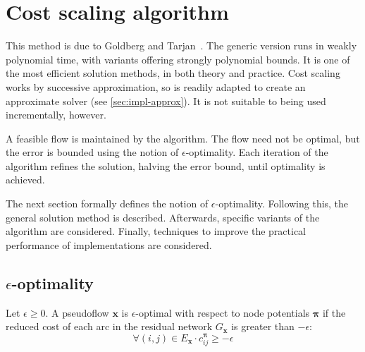 \section{Cost scaling algorithm} \label{sec:impl-cost-scaling}


This method is due to Goldberg and Tarjan~\cite{Goldberg:1987}. The generic version runs in weakly polynomial time, with variants offering strongly polynomial bounds. It is one of the most efficient solution methods, in both theory and practice\footnotemark. Cost scaling works by successive approximation, so is readily adapted to create an approximate solver (see \cref{sec:impl-approx}). It is not suitable to being used incrementally, however.

A feasible flow is maintained by the algorithm. The flow need not be optimal, but the error is bounded using the notion of $\epsilon$-optimality. Each iteration of the algorithm refines the solution, halving the error bound, until optimality is achieved. 

The next section formally defines the notion of $\epsilon$-optimality. Following this, the general solution method is described. Afterwards, specific variants of the algorithm are considered. Finally, techniques to improve the practical performance of implementations are considered.

\subsection{\texorpdfstring{$\epsilon$}{epsilon}-optimality}

\begin{defn}
\label{defn:epsilon-optimality}
Let $\epsilon \geq 0$. A pseudoflow $\mathbf{x}$ is $\epsilon$-optimal with respect to node potentials $\boldsymbol{\pi}$ if the reduced cost of each arc in the residual network $G_\mathbf{x}$ is greater than $-\epsilon$:
\begin{equation} \label{eq:epsilon-optimality}
\forall (i,j) \in E_{\mathbf{x}}\cdot c^{\boldsymbol{\pi}}_{ij} \geq -\epsilon
\end{equation}
\end{defn}

